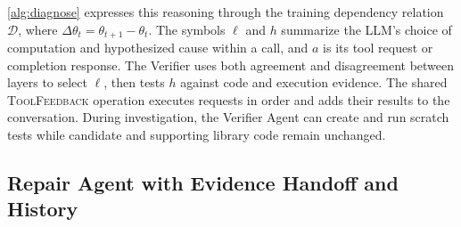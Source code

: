 \documentclass{article}
\begin{document}
{\cref{alg:diagnose} expresses this reasoning through the training dependency relation $\mathcal D$, where $\Delta\theta_t=\theta_{t+1}-\theta_t$. The symbols $\ell$ and $h$ summarize the LLM's choice of computation and hypothesized cause within a call, and $a$ is its tool request or completion response. The Verifier uses both agreement and disagreement between layers to select $\ell$, then tests $h$ against code and execution evidence. The shared \textsc{ToolFeedback} operation executes requests in order and adds their results to the conversation. During investigation, the Verifier Agent can create and run scratch tests while candidate and supporting library code remain unchanged.\par}

\subsection{Repair Agent with Evidence Handoff and History}
\label{sec:repair-agent}
\end{document}
